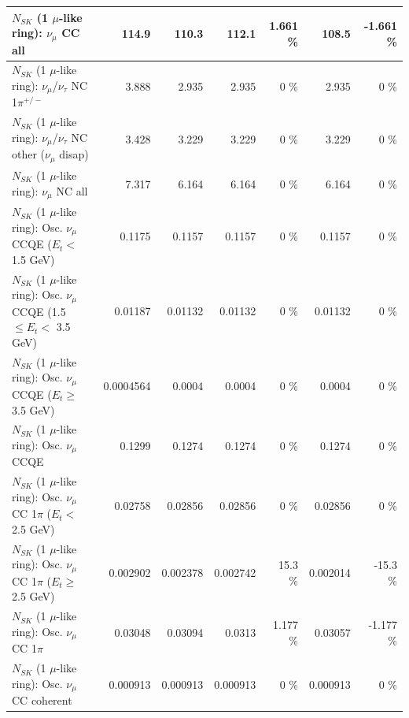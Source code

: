 \begin{table}
\begin{tabular}{| l | r | r | r  r | r  r |}
                                $N_{SK}$ (1 $\mu$-like ring): $\nu_{\mu}$ CC all &           114.9 &           110.3 &           112.1 &    1.661 \%  &           108.5 &   -1.661 \%  \\ 
\hline
              $N_{SK}$ (1 $\mu$-like ring): $\nu_\mu$/$\nu_\tau$ NC 1$\pi^{+/-}$ &           3.888 &           2.935 &           2.935 &        0 \%  &           2.935 &        0 \%  \\ 
   $N_{SK}$ (1 $\mu$-like ring): $\nu_\mu$/$\nu_\tau$ NC other ($\nu_\mu$ disap) &           3.428 &           3.229 &           3.229 &        0 \%  &           3.229 &        0 \%  \\ 
                                $N_{SK}$ (1 $\mu$-like ring): $\nu_{\mu}$ NC all &           7.317 &           6.164 &           6.164 &        0 \%  &           6.164 &        0 \%  \\ 
\hline
\hline
           $N_{SK}$ (1 $\mu$-like ring): Osc. $\nu_\mu$ CCQE ($E_{t} <$ 1.5 GeV) &          0.1175 &          0.1157 &          0.1157 &        0 \%  &          0.1157 &        0 \%  \\ 
  $N_{SK}$ (1 $\mu$-like ring): Osc. $\nu_\mu$ CCQE (1.5 $\leq E_{t} <$ 3.5 GeV) &         0.01187 &         0.01132 &         0.01132 &        0 \%  &         0.01132 &        0 \%  \\ 
        $N_{SK}$ (1 $\mu$-like ring): Osc. $\nu_\mu$ CCQE ($E_{t} \geq$ 3.5 GeV) &       0.0004564 &          0.0004 &          0.0004 &        0 \%  &          0.0004 &        0 \%  \\ 
\hline
                               $N_{SK}$ (1 $\mu$-like ring): Osc. $\nu_\mu$ CCQE &          0.1299 &          0.1274 &          0.1274 &        0 \%  &          0.1274 &        0 \%  \\ 
\hline
      $N_{SK}$ (1 $\mu$-like ring): Osc. $\nu_\mu$ CC 1$\pi$ ($E_{t} <$ 2.5 GeV) &         0.02758 &         0.02856 &         0.02856 &        0 \%  &         0.02856 &        0 \%  \\ 
   $N_{SK}$ (1 $\mu$-like ring): Osc. $\nu_\mu$ CC 1$\pi$ ($E_{t} \geq$ 2.5 GeV) &        0.002902 &        0.002378 &        0.002742 &     15.3 \%  &        0.002014 &    -15.3 \%  \\ 
\hline
                          $N_{SK}$ (1 $\mu$-like ring): Osc. $\nu_\mu$ CC 1$\pi$ &         0.03048 &         0.03094 &          0.0313 &    1.177 \%  &         0.03057 &   -1.177 \%  \\ 
                        $N_{SK}$ (1 $\mu$-like ring): Osc. $\nu_\mu$ CC coherent &        0.000913 &        0.000913 &        0.000913 &        0 \%  &        0.000913 &        0 \%  \\ 

\end{tabular}
\end{table}
